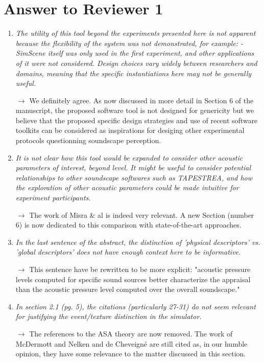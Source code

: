 \documentclass[10pt]{article}
\begin{document}
\section{Answer to Reviewer 1}

\begin{enumerate}

\item \emph{The utility of this tool beyond the experiments presented here is not apparent because the flexibility of the system was not demonstrated, for example:
- SimScene itself was only used in the first experiment, and other applications of it were not considered. Design choices vary widely between researchers and domains, meaning that the specific instantiations here may not be generally useful.}

$\rightarrow$ We definitely agree. As now discussed in more detail in Section 6 of the manuscript, the proposed software tool is not designed for genericity but we believe that the proposed specific design strategies and use of recent software toolkits can be considered as inspirations for desiging other experimental protocols questionning soundscape perception.

\item \emph{It is not clear how this tool would be expanded to consider other acoustic parameters of interest, beyond level. It might be useful to consider potential relationships to other soundscape softwares such as TAPESTREA, and how the exploration of other acoustic parameters could be made intuitive for experiment participants.}

$\rightarrow$ The work of Misra \& al is indeed very relevant. A new Section (number 6) is now dedicated to this comparison with state-of-the-art approaches.

\item \emph{In the last sentence of the abstract, the distinction of 'physical descriptors' vs. 'global descriptors'  does not have enough context here to be informative.}

$\rightarrow$ This sentence have be rewritten to be more explicit: "acoustic pressure levels computed for specific sound sources better characterize the appraisal than the acoustic pressure level computed over the overall soundscape."

\item \emph{In section 2.1 (pg. 5), the citations (particularly 27-31) do not seem relevant for justifying the event/texture distinction in the simulator.}

$\rightarrow$ The references to the ASA theory are now removed. The work of McDermott and Nelken and de Cheveigné are still cited as, in our humble opinion, they have some relevance to the matter discussed in this section.

\end{enumerate}
\end{document}
